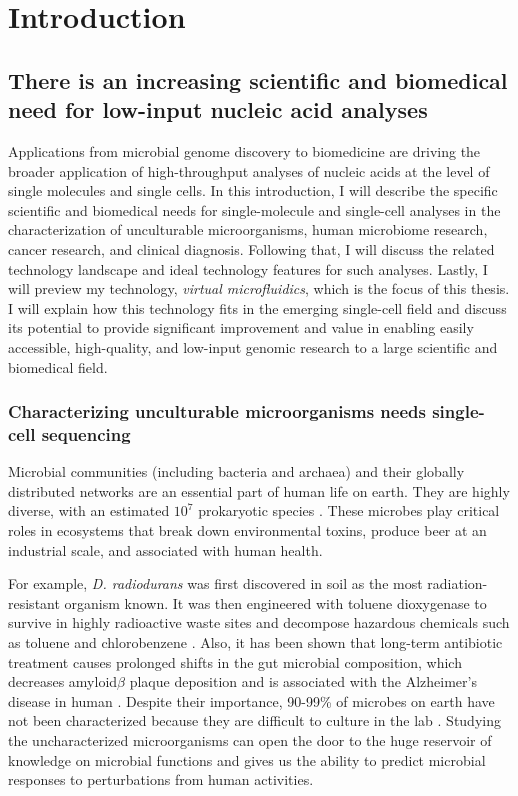 \chapter{Introduction}
\section{There is an increasing scientific and biomedical need for low-input nucleic acid analyses}

Applications from microbial genome discovery to biomedicine\cite{Blainey:2013hn,Marshall:2012jz,Wang:2012bb,Huggett:2015hp,Evrony:2016du,Evrony:2012dl,Rinke:2013bt,Navin:2011jq} are driving the broader application of high-throughput analyses of nucleic acids at the level of single molecules and single cells. In this introduction, I will describe the specific scientific and biomedical needs for single-molecule and single-cell analyses in the characterization of unculturable microorganisms, human microbiome research, cancer research, and clinical diagnosis. Following that, I will discuss the related technology landscape and ideal technology features for such analyses. Lastly, I will preview my technology, \textit{virtual microfluidics}, which is the focus of this thesis. I will explain how this technology fits in the emerging single-cell field and discuss its potential to provide significant improvement and value in enabling easily accessible, high-quality, and low-input genomic research to a large scientific and biomedical field. 

\subsection{Characterizing unculturable microorganisms needs single-cell sequencing}

Microbial communities (including bacteria and archaea) and their globally distributed networks are an essential part of human life on earth. They are highly diverse, with an estimated $10^{7}$ prokaryotic species \cite{Curtis:2002dj}. These microbes play critical roles in ecosystems that break down environmental toxins, produce beer at an industrial scale, and associated with human health. 

For example, \textit{D. radiodurans} was first discovered in soil as the most radiation-resistant organism known. It was then engineered with toluene dioxygenase to survive in highly radioactive waste sites and decompose hazardous chemicals such as toluene and chlorobenzene \cite{Lange:1998ea}. Also, it has been shown that long-term antibiotic treatment causes prolonged shifts in the gut microbial composition, which decreases amyloid$\beta$ plaque deposition and is associated with the Alzheimer's disease in human \cite{Minter:2016ga}. Despite their importance, 90-99\% of microbes on earth have not been characterized because they are difficult to culture in the lab \cite{Yilmaz:2011bc}. Studying the uncharacterized microorganisms can open the door to the huge reservoir of knowledge on microbial functions and gives us the ability to predict microbial responses to perturbations from human activities.  

